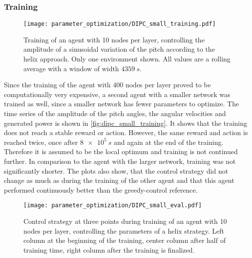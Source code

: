 \subsubsection{Training}
\begin{figure}[h]
	\centering
	\texttt{[image: parameter\_optimization/DIPC\_small\_training.pdf]}
	\caption{Training of an agent with 10 nodes per layer, controlling the amplitude of a sinusoidal variation of the pitch according to the helix approach. Only one environment shown. All values are a rolling average with a window of width $\SI{4359}{s}$.}
	\label{fig:dipc_small_training}
\end{figure}
Since the training of the agent with 400 nodes per layer proved to be computationally very expensive, a second agent with a smaller network was trained as well, since a smaller network has fewer parameters to optimize. The time series of the amplitude of the pitch angles, the angular velocities and generated power is shown in \autoref{fig:dipc_small_training}. It shows that the training does not reach a stable reward or action. However, the same reward and action is reached twice, once after $\SI{8e5}{s}$ and again at the end of the training. Therefore it is assumed to be the local optimum and training is not continued further. In comparison to the agent with the larger network, training was not significantly shorter. The plots also show, that the control strategy did not change as much as during the training of the other agent and that this agent performed continuously better than the greedy-control reference.
\begin{figure}[h]
\centering
\texttt{[image: parameter\_optimization/DIPC\_small\_eval.pdf]}
\caption{Control strategy at three points during training of an agent with 10 nodes per layer, controlling the parameters of a helix strategy. Left column at the beginning of the training, center column after half of training time, right column after the training is finalized.}
\label{fig:dipc_small_strategies}
\end{figure} \\
